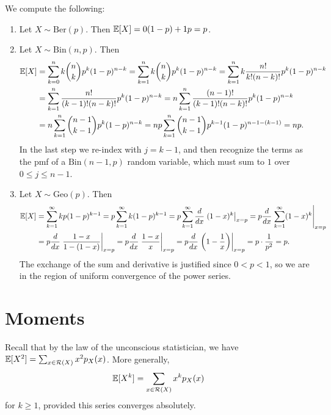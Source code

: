 \begin{example} We compute the following:
  \begin{enumerate}
    \item Let $X \sim \mathrm{Ber}(p)$. Then
      $\mathbb{E}[X] = 0(1 - p) + 1p = p$.
    \item Let $X \sim \mathrm{Bin}(n, p)$. Then
      \begin{align*}
        \mathbb{E}[X]
        &= \sum_{k = 0}^n k \binom{n}{k} p^k (1 - p)^{n - k}
        = \sum_{k = 1}^n k \binom{n}{k} p^k (1 - p)^{n - k}
        = \sum_{k = 1}^n k \frac{n!}{k!(n - k)!} p^k (1 - p)^{n - k} \\
        &= \sum_{k = 1}^n \frac{n!}{(k - 1)!(n - k)!} p^k (1 - p)^{n - k}
        = n \sum_{k = 1}^n \frac{(n - 1)!}{(k - 1)!(n - k)!} p^k (1 - p)^{n - k} \\
        &= n \sum_{k = 1}^n \binom{n - 1}{k - 1} p^k (1 - p)^{n - k}
        = np \sum_{k = 1}^n \binom{n - 1}{k - 1} p^{k - 1} (1 - p)^{n - 1 - (k - 1)} = np.
      \end{align*}
      In the last step we re-index with $j = k - 1$,
      and then recognize the terms as the pmf
      of a $\mathrm{Bin}(n - 1, p)$ random variable,
      which must sum to $1$ over $0 \le j \le n - 1$.
    \item Let $X \sim \mathrm{Geo}(p)$. Then
      \begin{align*}
        \mathbb{E}[X]
        &= \sum_{k = 1}^\infty k p(1 - p)^{k - 1}
        = p \sum_{k = 1}^\infty k(1 - p)^{k - 1}
        = p \sum_{k = 1}^\infty \frac{d}{dx}\left. (1 - x)^k\right|_{x = p}
        = p \frac{d}{dx} \left.\sum_{k = 1}^\infty (1 - x)^k\right|_{x = p} \\
        &= p \frac{d}{dx} \left.\frac{1 - x}{1 - (1 - x)}\right|_{x = p}
        = p \frac{d}{dx} \left.\frac{1 - x}{x}\right|_{x = p}
        = p \frac{d}{dx} \left.\left(1 - \frac{1}{x}\right)\right|_{x = p}
        = p \cdot \frac{1}{p^2} = p.
      \end{align*}
      The exchange of the sum and derivative is
      justified since $0 < p < 1$, so we are in the
      region of uniform convergence of the power
      series.
  \end{enumerate}
\end{example}

\section{Moments}
Recall that by the law of the unconscious statistician,
we have $\mathbb{E}[X^2] = \sum_{x \in \mathcal{R}(X)} x^2 p_X(x)$.
More generally,
\[
  \mathbb{E}[X^k] = \sum_{x \in \mathcal{R}(X)} x^k p_X(x)
\]
for $k \ge 1$, provided this series converges
absolutely.

